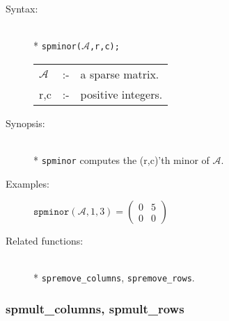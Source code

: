 \begin{description}
\item[Syntax:]\mbox{}\\*
\texttt{spminor($\mathcal{A}$,r,c);}\\[2mm]
\begin{tabular}{l l l} 
$\mathcal{A}$ &:-& a sparse matrix. \\
r,c        &:-& positive integers.
\end{tabular}

\item[Synopsis:]\mbox{}\\*
                \texttt{spminor} computes the (r,c)'th minor of $\mathcal{A}$.
 
\item[Examples:]
\begin{flushleft}  
\begin{math}  
\texttt{spminor}(\mathcal{A},1,3) =
        \begin{pmatrix} 0 & 5 \\ 0 & 0  \end{pmatrix}
\end{math}  
\end{flushleft}

\item[Related functions:]\mbox{}\\*
 \texttt{spremove\_columns}, \texttt{spremove\_rows}.
\end{description}

\subsubsection{spmult\_columns, spmult\_rows}
\label{sparse:spmult_columns}

